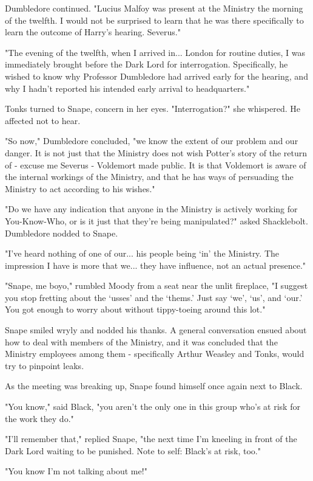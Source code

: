 \documentclass[a4paper,11pt]{article}
\begin{document}
Dumbledore continued. "Lucius Malfoy was present at the Ministry the morning of the twelfth. I would not be surprised to learn that he was there specifically to learn the outcome of Harry's hearing. Severus."

"The evening of the twelfth, when I arrived in... London for routine duties, I was immediately brought before the Dark Lord for interrogation. Specifically, he wished to know why Professor Dumbledore had arrived early for the hearing, and why I hadn't reported his intended early arrival to headquarters."

Tonks turned to Snape, concern in her eyes. "Interrogation?" she whispered. He affected not to hear.

"So now," Dumbledore concluded, "we know the extent of our problem and our danger. It is not just that the Ministry does not wish Potter's story of the return of - excuse me Severus - Voldemort made public. It is that Voldemort is aware of the internal workings of the Ministry, and that he has ways of persuading the Ministry to act according to his wishes."

"Do we have any indication that anyone in the Ministry is actively working for You-Know-Who, or is it just that they're being manipulated?" asked Shacklebolt. Dumbledore nodded to Snape.

"I've heard nothing of one of our... his people being `in' the Ministry. The impression I have is more that we... they have influence, not an actual presence."

"Snape, me boyo," rumbled Moody from a seat near the unlit fireplace, "I suggest you stop fretting about the `usses' and the `thems.' Just say `we', `us', and `our.' You got enough to worry about without tippy-toeing around this lot."

Snape smiled wryly and nodded his thanks. A general conversation ensued about how to deal with members of the Ministry, and it was concluded that the Ministry employees among them - specifically Arthur Weasley and Tonks, would try to pinpoint leaks.

As the meeting was breaking up, Snape found himself once again next to Black.

"You know," said Black, "you aren't the only one in this group who's at risk for the work they do."

"I'll remember that," replied Snape, "the next time I'm kneeling in front of the Dark Lord waiting to be punished. Note to self: Black's at risk, too."

"You know I'm not talking about me!"
\end{document}
